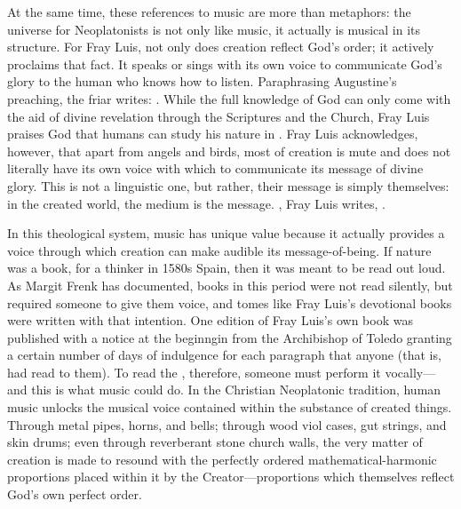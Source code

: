 At the same time, these references to music are more than metaphors: the
universe for Neoplatonists is not only like music, it actually is musical in
its structure.
For Fray Luis, not only does creation reflect God's order; it actively
proclaims that fact.
It speaks or sings with its own voice to communicate God's glory to the human
who knows how to listen.
Paraphrasing Augustine's preaching, the friar writes: .%
    \Autocite[185, glossing Augustine's commentary on Psalm 26]
    {LuisdeGranada:Simbolo} 
While the full knowledge of God can only come with the aid of divine revelation
through the Scriptures and the Church, Fray Luis praises God that humans can
study his nature in .%
    \Autocite[186]{LuisdeGranada:Simbolo}
Fray Luis acknowledges, however, that apart from angels and birds, most of
creation is mute and does not literally have its own voice with which to
communicate its message of divine glory.
This  is not a linguistic one, but rather, their message is
simply themselves: in the created world, the medium is the message.
, Fray Luis writes, .%
    \Autocite[192]{LuisdeGranada:Simbolo}

In this theological system, music has unique value because it actually provides
a voice through which creation can make audible its message-of-being.
If nature was a book, for a thinker in 1580s Spain, then it was meant to be
read out loud.
As Margit Frenk has documented, books in this period were not read silently,
but required someone to give them voice, and tomes like Fray Luis's devotional
books were written with that intention.%
    \Autocite{Frenk:Voz}
One edition of Fray Luis's own book  was published
with a notice at the beginngin from the Archibishop of Toledo granting a
certain number of days of indulgence for each paragraph that anyone
 (that is, had read to them).%
    \citXXX[signature]
To read the , therefore, someone must perform it
vocally---and this is what music could do.
In the Christian Neoplatonic tradition, human music unlocks the musical voice
contained within the substance of created things.
Through metal pipes, horns, and bells; through wood viol cases, gut strings,
and skin drums; even through reverberant stone church walls, the very matter of
creation is made to resound with the perfectly ordered mathematical-harmonic
proportions placed within it by the Creator---proportions which themselves
reflect God's own perfect order.

